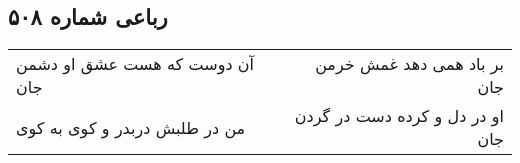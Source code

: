 \begin{center}
\section*{رباعی شماره ۵۰۸}
\label{sec:sh508}
\begin{longtable}{l p{0.5cm} r}
آن دوست که هست عشق او دشمن جان
&&
بر باد همی دهد غمش خرمن جان
\\
من در طلبش دربدر و کوی به کوی
&&
او در دل و کرده دست در گردن جان
\\
\end{longtable}
\end{center}
